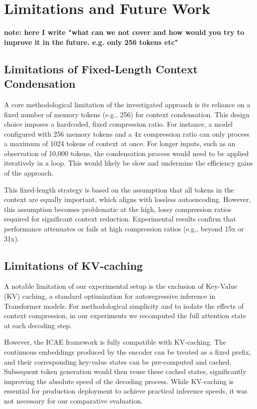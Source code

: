 \chapter{Limitations and Future Work}

\textbf{note: here I write "what can we not cover and how would you try to improve it in the future. e.g. only 256 tokens etc"}

\section{Limitations of Fixed-Length Context Condensation}

A core methodological limitation of the investigated approach is its reliance on a fixed number of memory tokens (e.g., 256) for context condensation. This design choice imposes a hardcoded, fixed compression ratio. For instance, a model configured with 256 memory tokens and a 4x compression ratio can only process a maximum of 1024 tokens of context at once. For longer inputs, such as an observation of 10,000 tokens, the condensation process would need to be applied iteratively in a loop. This would likely be slow and undermine the efficiency gains of the approach.

This fixed-length strategy is based on the assumption that all tokens in the context are equally important, which aligns with lossless autoencoding. However, this assumption becomes problematic at the high, lossy compression ratios required for significant context reduction. Experimental results confirm that performance attenuates or fails at high compression ratios (e.g., beyond 15x or 31x).


\section{Limitations of KV-caching}
A notable limitation of our experimental setup is the exclusion of Key-Value (KV) caching, a standard optimization for autoregressive inference in Transformer models.
For methodological simplicity and to isolate the effects of context compression, in our experiments we recomputed the full attention state at each decoding step.

However, the ICAE framework is fully compatible with KV-caching.
The continuous embeddings produced by the encoder can be treated as a fixed prefix, and their corresponding key-value states can be pre-computed and cached.
Subsequent token generation would then reuse these cached states, significantly improving the absolute speed of the decoding process.
While KV-caching is essential for production deployment to achieve practical inference speeds, it was not necessary for our comparative evaluation.

